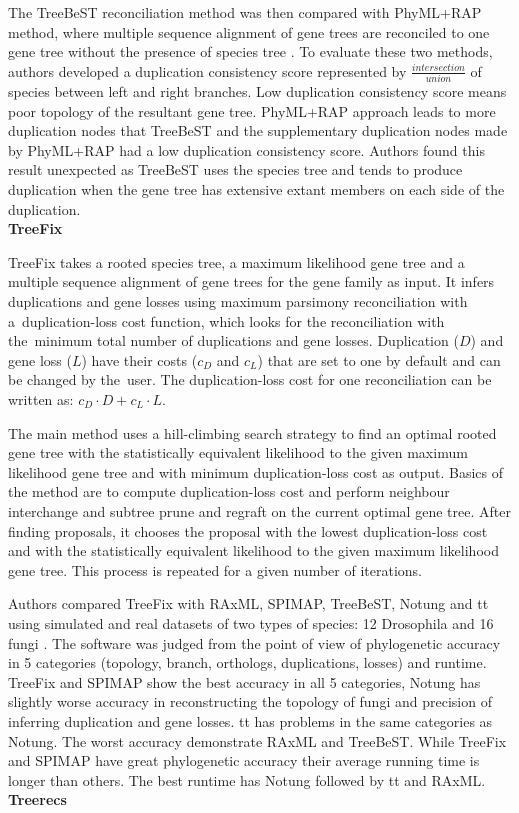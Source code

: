 The TreeBeST reconciliation method was then compared with PhyML+RAP method, where multiple sequence alignment of gene trees are reconciled to one gene tree without the presence of species tree \cite{treebest}. To evaluate these two methods, authors developed a duplication consistency score represented by \( \frac{intersection}{union} \) of species between left and right branches. Low duplication consistency score means poor topology of the resultant gene tree. PhyML+RAP approach leads to more duplication nodes that TreeBeST and the supplementary duplication nodes made by PhyML+RAP had a low duplication consistency score. Authors found this result unexpected as TreeBeST uses the species tree and tends to produce duplication when the gene tree has extensive extant members on each side of the duplication.\\
\textbf{TreeFix}  

TreeFix \cite{treefix_tutorial} takes a rooted species tree, a maximum likelihood gene tree and a multiple sequence alignment of gene trees for the gene family as input. It infers duplications and gene losses using maximum parsimony reconciliation with a~duplication-loss cost function, which looks for the reconciliation with the~minimum total number of duplications and gene losses. Duplication ($D$) and gene loss ($L$) have their costs ($c_D$ and $c_L$) that are set to one by default and can be changed by the~user. The duplication-loss cost for one reconciliation can be written as: $c_D \cdot D+c_L \cdot L$. 

The main method \cite{treefix} uses a hill-climbing search strategy to find an optimal rooted gene tree with the statistically equivalent likelihood to the given maximum likelihood gene tree and with minimum duplication-loss cost as output. Basics of the method are to compute duplication-loss cost and perform neighbour interchange and subtree prune and regraft on the current optimal gene tree. After finding proposals, it chooses the proposal with the lowest duplication-loss cost and with the statistically equivalent likelihood to the given maximum likelihood gene tree. This process is repeated for a given number of iterations.

Authors compared TreeFix with RAxML, SPIMAP, TreeBeST, Notung and tt using simulated and real datasets of two types of species: 12 Drosophila and 16 fungi \cite{treefix_online}. The software was judged from the point of view of phylogenetic accuracy in 5 categories (topology, branch, orthologs, duplications, losses) and runtime. TreeFix and SPIMAP show the best accuracy in all 5 categories, Notung has slightly worse accuracy in reconstructing the topology of fungi and precision of inferring duplication and gene losses. tt has problems in the same categories as Notung. The worst accuracy demonstrate RAxML and TreeBeST. While TreeFix and SPIMAP have great phylogenetic accuracy their average running time is longer than others. The best runtime has Notung followed by tt and RAxML.\\
\textbf{Treerecs} 

